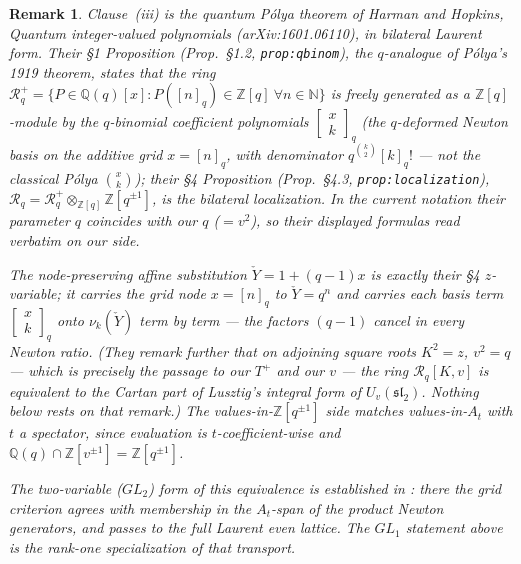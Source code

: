 \documentclass[11pt]{article}
\newtheorem{remark}{Remark}
\newcommand{\At}{A_t}
\newcommand{\Yc}{\check Y}
\newcommand{\Z}{\mathbb Z}
\begin{document}
\begin{remark}
Clause~(iii) is the quantum P\'olya theorem of Harman and Hopkins,
\emph{Quantum integer-valued polynomials} (arXiv:1601.06110), in bilateral
Laurent form. Their \S1 Proposition (Prop.~\S1.2, \texttt{prop:qbinom}), the
$q$-analogue of P\'olya's 1919 theorem, states that the ring
$\mathcal R_q^{+}=\{P\in\mathbb Q(q)[x]:P([n]_q)\in\Z[q]\ \forall n\in\mathbb N\}$
is freely generated as a $\Z[q]$-module by the $q$-binomial coefficient
polynomials $\begin{bmatrix}x\\k\end{bmatrix}_{q}$ (the $q$-deformed Newton
basis on the \emph{additive} grid $x=[n]_q$, with denominator
$q^{\binom{k}{2}}[k]_q!$ --- not the classical P\'olya $\binom{x}{k}$); their \S4
Proposition (Prop.~\S4.3, \texttt{prop:localization}),
$\mathcal R_q=\mathcal R_q^{+}\otimes_{\Z[q]}\Z[q^{\pm1}]$, is the bilateral
localization. In the current notation their parameter $q$ coincides with our
$q$ ($=v^{2}$), so their displayed formulas read verbatim on our side.

The node-preserving affine substitution $\Yc=1+(q-1)x$ is exactly their \S4
$z$-variable; it carries the grid node $x=[n]_q$ to $\Yc=q^{n}$ and carries each
basis term $\begin{bmatrix}x\\k\end{bmatrix}_{q}$ onto $\nu_k(\Yc)$ \emph{term by
term} --- the factors $(q-1)$ cancel in every Newton ratio. (They remark further
that on adjoining square roots $K^{2}=z$, $v^{2}=q$ --- which is precisely the
passage to our $T^{+}$ and our $v$ --- the ring $\mathcal R_q[K,v]$ is equivalent
to the Cartan part of Lusztig's integral form of $U_v(\mathfrak{sl}_2)$. Nothing
below rests on that remark.) The values-in-$\Z[q^{\pm1}]$
side matches values-in-$\At$ with $t$ a spectator, since evaluation is
$t$-coefficient-wise and $\mathbb Q(q)\cap\Z[v^{\pm1}]=\Z[q^{\pm1}]$.

The two-variable ($GL_2$) form of this equivalence is established in
\cite{SandboxGL2}: there the grid criterion agrees with membership in the
$\At$-span of the product Newton generators, and passes to the full Laurent
even lattice. The $GL_1$ statement above is the rank-one specialization of
that transport.
\end{remark}
\end{document}
